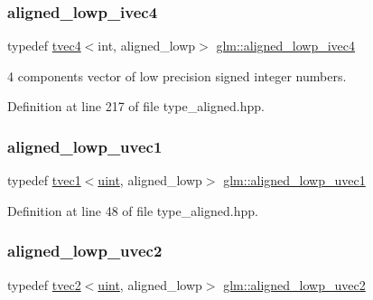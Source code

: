 \subsubsection{\texorpdfstring{aligned\_lowp\_ivec4}{aligned\_lowp\_ivec4}}
{\footnotesize\ttfamily typedef \mbox{\hyperlink{structglm_1_1tvec4}{tvec4}}$<$int, aligned\+\_\+lowp$>$ \mbox{\hyperlink{group__gtc__type__aligned_ga7605da765c208f1008519a167dddd6d9}{glm\+::aligned\+\_\+lowp\+\_\+ivec4}}}



4 components vector of low precision signed integer numbers. 



Definition at line 217 of file type\+\_\+aligned.\+hpp.

\mbox{\label{group__gtc__type__aligned_gab370245153f6b995068aac82bfb31ed6}} 
\subsubsection{\texorpdfstring{aligned\_lowp\_uvec1}{aligned\_lowp\_uvec1}}
{\footnotesize\ttfamily typedef \mbox{\hyperlink{structglm_1_1tvec1}{tvec1}}$<$\mbox{\hyperlink{group__core__precision_ga4fd29415871152bfb5abd588334147c8}{uint}}, aligned\+\_\+lowp$>$ \mbox{\hyperlink{group__gtc__type__aligned_gab370245153f6b995068aac82bfb31ed6}{glm\+::aligned\+\_\+lowp\+\_\+uvec1}}}



Definition at line 48 of file type\+\_\+aligned.\+hpp.

\mbox{\label{group__gtc__type__aligned_gae35234d451a8160abf2915753e015269}} 
\subsubsection{\texorpdfstring{aligned\_lowp\_uvec2}{aligned\_lowp\_uvec2}}
{\footnotesize\ttfamily typedef \mbox{\hyperlink{structglm_1_1tvec2}{tvec2}}$<$\mbox{\hyperlink{group__core__precision_ga4fd29415871152bfb5abd588334147c8}{uint}}, aligned\+\_\+lowp$>$ \mbox{\hyperlink{group__gtc__type__aligned_gae35234d451a8160abf2915753e015269}{glm\+::aligned\+\_\+lowp\+\_\+uvec2}}}

